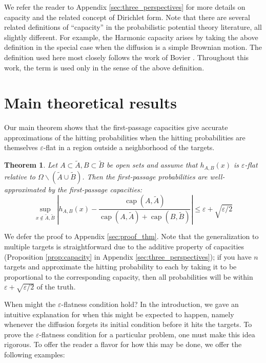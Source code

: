 \documentclass[12pt, nofootinbib,english, amsmath, amssymb, aps, priprint, graphicx,floatfix]{revtex4-1}
\newtheorem{theorem}{Theorem}
\theoremstyle{plain}
\theoremstyle{definition}
\theoremstyle{plain}
\newcommand{\capac}[2]{\ensuremath{\operatorname{cap}}(#1,#2)}
\begin{document}
We refer the reader to Appendix \ref{sec:three_perspectives} for more details on capacity and the related concept of Dirichlet form.  Note that there are several related definitions of ``capacity'' in the probabilistic potential theory literature, all slightly different.  For example, the Harmonic capacity arises by taking the above definition in the special case when the diffusion is a simple Brownian motion.  The definition used here most closely follows the work of Bovier \cite{Bovier2016-ez,Bovier2004-wj}.  Throughout this work, the term is used only in the sense of the above definition.

\section{Main theoretical results}
\label{sec:MainResults}

Our main theorem shows that the first-passage capacities give accurate approximations of the hitting probabilities when the hitting probabilities are themselves $\varepsilon$-flat in a region outside a neighborhood of the targets.

\begin{theorem}\label{thm:main_thm}
Let $A\subset \tilde A,B\subset \tilde B$ be open sets and assume that  $h_{A,B}(x)$ is $\varepsilon$-flat relative to
$\Omega \backslash (\tilde A \cup \tilde B)$.
Then the first-passage probabilities are well-approximated by the first-passage capacities:
\[ \sup_{x \notin \tilde A,\tilde B} \left| h_{A,B} (x) - \frac{\capac{A}{\tilde A}}{\capac{A}{\tilde A}+\capac{B}{\tilde B}} \right| \leqslant \varepsilon + \sqrt{\varepsilon/2} \]
\end{theorem}

We defer the proof to Appendix \ref{sec:proof_thm}.  Note that the generalization to multiple targets is straightforward due to the additive property of capacities (Proposition \ref{prop:capacity} in Appendix \ref{sec:three_perspectives}); if you have $n$ targets and approximate the hitting probability to each by taking it to be proportional to the corresponding capacity, then all probabilities will be within $\varepsilon+\sqrt{\varepsilon/2}$ of the truth.

When might the $\varepsilon$-flatness condition hold?  In the introduction, we gave an intuitive explanation for when this might be expected to happen, namely whenever the diffusion forgets its initial condition before it hits the targets.  To prove the $\varepsilon$-flatness condition for a particular problem, one must make this idea rigorous.  To offer the reader a flavor for how this may be done, we offer the following examples:
\end{document}
